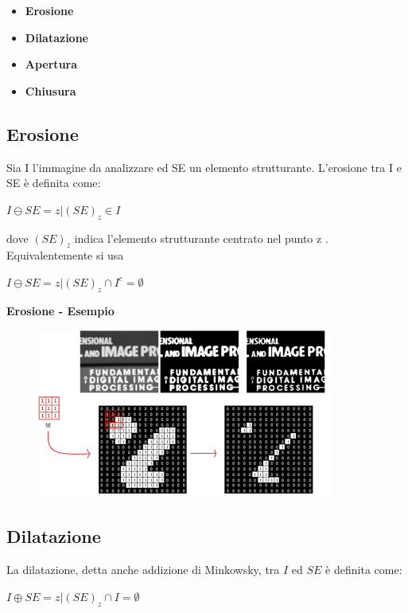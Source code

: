 \begin{itemize}
    \item \textbf{Erosione}
    \item \textbf{Dilatazione}
    \item \textbf{Apertura}
    \item \textbf{Chiusura}
\end{itemize}

\subsection{Erosione}
Sia I l'immagine da analizzare ed SE un elemento strutturante.
L'erosione tra I e SE è definita come:
\begin{center}
    $I \ominus SE = {z|(SE)_z \in I} $
\end{center}
dove $(SE)_z$ indica l'elemento strutturante centrato nel punto z .
Equivalentemente si usa
\begin{center}
    $I \ominus SE = {z|(SE)_z \cap I^c = \emptyset}$
\end{center}
\textbf{Erosione - Esempio}

\begin{figure}[H]
    \centering
    \includegraphics[width=\linewidth, keepaspectratio]{capitoli/immagini/imgs/erosione-esempio.png}
\end{figure}

\subsection{Dilatazione}
La dilatazione, detta anche addizione di Minkowsky, tra $I$ ed $SE$ è
definita come:

\begin{center}
    $I \oplus SE = {z|(SE)_z \cap I = \emptyset}$
\end{center}

